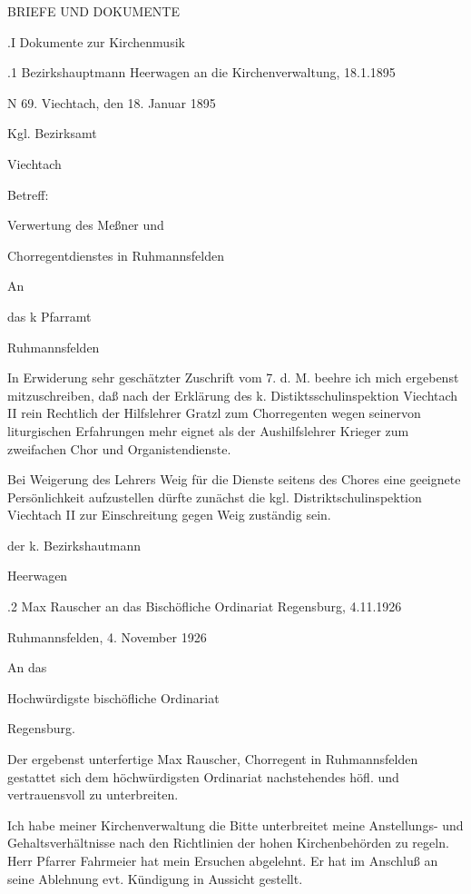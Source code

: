 BRIEFE UND DOKUMENTE

.I Dokumente zur Kirchenmusik

.1 Bezirkshauptmann Heerwagen an die Kirchenverwaltung, 18.1.1895

N 69.               Viechtach, den 18. Januar 1895



Kgl. Bezirksamt

Viechtach



Betreff:



Verwertung des Meßner und

Chorregentdienstes in Ruhmannsfelden



An

das k Pfarramt

Ruhmannsfelden



In Erwiderung sehr geschätzter Zuschrift vom 7. d. M. beehre ich mich ergebenst
mitzuschreiben, daß nach der Erklärung des k. Distiktsschulinspektion Viechtach
II rein Rechtlich der Hilfslehrer Gratzl zum Chorregenten wegen seinervon
liturgischen Erfahrungen mehr  eignet als der Aushilfslehrer Krieger zum
zweifachen Chor und Organistendienste.

Bei  Weigerung des Lehrers Weig für die Dienste seitens des Chores eine
geeignete Persönlichkeit aufzustellen dürfte zunächst die kgl.
Distriktschulinspektion Viechtach II zur Einschreitung gegen Weig zuständig
sein.



der k. Bezirkshautmann



Heerwagen

.2 Max Rauscher an das Bischöfliche Ordinariat Regensburg, 4.11.1926

Ruhmannsfelden, 4. November 1926

An das

    Hochwürdigste bischöfliche Ordinariat

                    Regensburg.



Der ergebenst unterfertige Max Rauscher, Chorregent in Ruhmannsfelden gestattet
sich dem höchwürdigsten Ordinariat nachstehendes höfl. und vertrauensvoll zu
unterbreiten.

Ich habe meiner Kirchenverwaltung die Bitte unterbreitet meine Anstellungs- und
Gehaltsverhältnisse nach den Richtlinien der hohen Kirchenbehörden zu regeln.
Herr Pfarrer Fahrmeier hat mein Ersuchen abgelehnt. Er hat im Anschluß an seine
Ablehnung evt. Kündigung in Aussicht gestellt.

